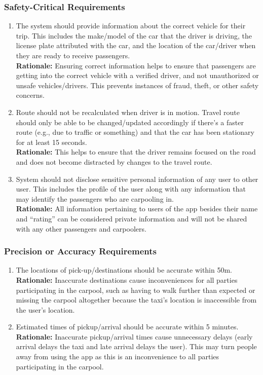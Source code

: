 \documentclass[]{article}
\begin{document}
\subsubsection{Safety-Critical Requirements}
\label{ssub:safety_critical_requirements}
\begin{enumerate}[{PR-SC}1. ]
	\item The system should provide information about the correct vehicle for their trip. This includes the make/model of the car that the driver is driving, the license plate attributed with the car, and the location of the car/driver when they are ready to receive passengers.\\
	{\bf Rationale:} Ensuring correct information helps to ensure that passengers are getting into the correct vehicle with a verified driver, and not unauthorized or unsafe vehicles/drivers. This prevents instances of fraud, theft, or other safety concerns. 
	\item Route should not be recalculated when driver is in motion. Travel route should only be able to be changed/updated accordingly if there's a faster route (e.g., due to traffic or something) and that the car has been stationary for at least 15 seconds.\\
	{\bf Rationale:} This helps to ensure that the driver remains focused on the road and does not become distracted by changes to the travel route.
	\item System should not disclose sensitive personal information of any user to other user. This includes the profile of the user along with any information that may identify the passengers who are carpooling in.\\
	{\bf Rationale:} All information pertaining to users of the app besides their name and “rating” can be considered private information and will not be shared with any other passengers and carpoolers. 
\end{enumerate}

\subsubsection{Precision or Accuracy Requirements}
\label{ssub:precision_or_accuracy_requirements}
\begin{enumerate}[{PR-PA}1. ]
	\item The locations of pick-up/destinations should be accurate within 50m.\\
	{\bf Rationale:} Inaccurate destinations cause inconveniences for all parties participating in the carpool, such as having to walk further than expected or missing the carpool altogether because the taxi's location is inaccessible from the user's location. 
	\item Estimated times of pickup/arrival should be accurate within 5 minutes.\\
	{\bf Rationale:} Inaccurate pickup/arrival times cause unnecessary delays (early arrival delays the taxi and late arrival delays the user). This may turn people away from using the app as this is an inconvenience to all parties participating in the carpool. 
\end{enumerate}
\end{document}
